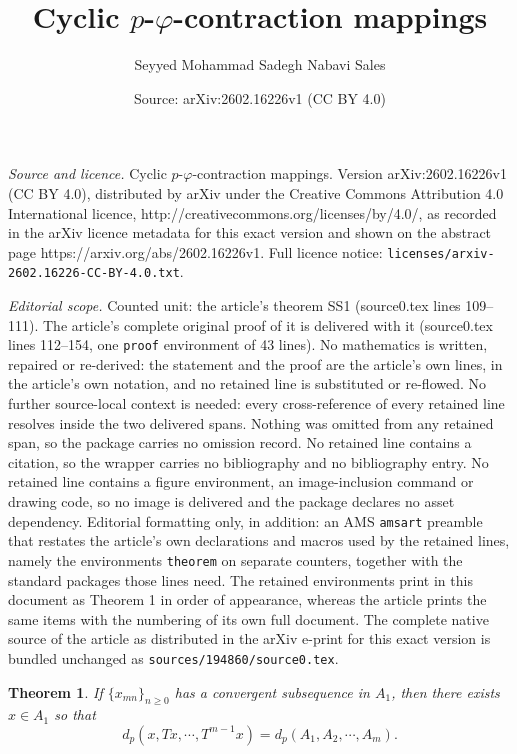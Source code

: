 \documentclass[10pt,a4paper]{amsart}
\title{Cyclic $p$-$\varphi$-contraction mappings}
\author{Seyyed Mohammad Sadegh Nabavi Sales}
\date{Source: arXiv:2602.16226v1 (CC BY 4.0)}
\newtheorem{theorem}{Theorem}
\begin{document}
\maketitle

\noindent\emph{Source and licence.} Cyclic $p$-$\varphi$-contraction mappings. Version arXiv:2602.16226v1 (CC BY 4.0), distributed by arXiv under the Creative Commons Attribution 4.0 International licence, http://creativecommons.org/licenses/by/4.0/, as recorded in the arXiv licence metadata for this exact version and shown on the abstract page https://arxiv.org/abs/2602.16226v1. Full licence notice: \texttt{licenses/arxiv-2602.16226-CC-BY-4.0.txt}.\par\smallskip

\noindent\textit{Editorial scope.} Counted unit: the article's theorem SS1 (source0.tex lines 109--111). The article's complete original proof of it is delivered with it (source0.tex lines 112--154, one \texttt{proof} environment of 43 lines). No mathematics is written, repaired or re-derived: the statement and the proof are the article's own lines, in the article's own notation, and no retained line is substituted or re-flowed.  No further source-local context is needed: every cross-reference of every retained line resolves inside the two delivered spans.  Nothing was omitted from any retained span, so the package carries no omission record.  No retained line contains a citation, so the wrapper carries no bibliography and no bibliography entry.  No retained line contains a figure environment, an image-inclusion command or drawing code, so no image is delivered and the package declares no asset dependency.  Editorial formatting only, in addition: an AMS \texttt{amsart} preamble that restates the article's own declarations and macros used by the retained lines, namely the environments \texttt{theorem} on separate counters, together with the standard packages those lines need.  The retained environments print in this document as Theorem 1 in order of appearance, whereas the article prints the same items with the numbering of its own full document.  The complete native source of the article as distributed in the arXiv e-print for this exact version is bundled unchanged as \texttt{sources/194860/source0.tex}.
\begin{theorem}\label{SS1}
 If $\{x_{mn}\}_{n\geq0}$ has a convergent subsequence in $A_1$, then there exists $x\in A_1$ so that $$d_p(x,Tx,\cdots,T^{m-1}x)=d_p(A_1,A_2,\cdots,A_m).$$
\end{theorem}
\end{document}
